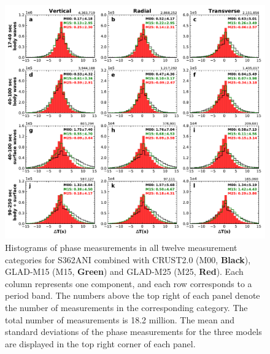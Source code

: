 \documentclass[extra,mreferee]{gji}
\begin{document}
\begin{figure}
  \centering
  \includegraphics[width=\textwidth]{figures/dt_histogram.pdf}
  \caption{Histograms of phase measurements in all twelve measurement categories for S362ANI combined with CRUST2.0 (M00, \textbf{Black}), GLAD-M15 (M15, \textbf{{\color{ForestGreen} Green}}) and GLAD-M25 (M25, \textbf{{\color{Red} Red}}).
  Each column represents one component, and each row corresponds to a period band.
  The numbers above the top right of each panel denote the number of measurements in the corresponding category.
  The total number of measurements is 18.2 million.
  The mean and standard deviations of the phase measurements for the three models are displayed in the top right corner of each panel.}
  \label{fig:phase_hist}
\end{figure}
\end{document}
